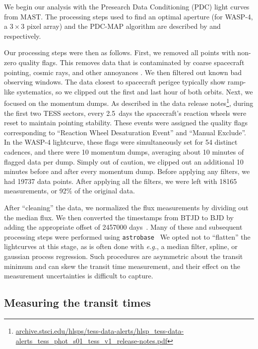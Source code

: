 \documentclass[12pt,twocolumn,tighten]{aastex62}
\begin{document}
We begin our analysis with the Presearch Data Conditioning (PDC) light
curves from MAST.  The processing steps used to find an optimal
aperture (for WASP-4, a $3\times 3$ pixel array) and the PDC-MAP
algorithm are described by \citet{smith_kepler_apertures_2017} and
\citet{smith_kepler_PDC_2017} respectively.

Our processing steps were then as follows.  First, we removed all
points with non-zero quality flags.  This removes data that is
contaminated by coarse spacecraft pointing, cosmic rays, and other
annoyances \citep{tess_data_product_description_2018}.  We then
filtered out known bad observing windows.  The data closest to
spacecraft perigee typically show ramp-like systematics, so we clipped
out the first and last hour of both orbits.  Next, we focused on the
momentum dumps. As described in the data release
notes\footnote{\url{archive.stsci.edu/hlsps/tess-data-alerts/hlsp_tess-data-alerts_tess_phot_s01_tess_v1_release-notes.pdf}},
during the first two TESS sectors, every 2.5~days the spacecraft's
reaction wheels were reset to maintain pointing stability.  These
events were assigned the quality flags corresponding to ``Reaction
Wheel Desaturation Event'' and ``Manual Exclude''.  In the WASP-4
lightcurve, these flags were simultaneously set for 54 distinct
cadences, and there were 10 momentum dumps, averaging about 10 minutes
of flagged data per dump.  Simply out of caution, we clipped out an
additional 10 minutes before and after every momentum dump.  Before
applying any filters, we had 19737 data points. After applying all the
filters, we were left with 18165 measurements, or 92\% of the original
data.

After ``cleaning'' the data, we normalized the flux measurements by
dividing out the median flux.  We then converted the timestamps from
BTJD to BJD by adding the appropriate offset of 2457000
days~\citep{tess_data_product_description_2018}.  Many of these and
subsequent processing steps were performed using
\texttt{astrobase}~\citep{bhatti_astrobase_2018} We opted not to
``flatten'' the lightcurves at this stage, as is often done with {\it e.g.}, a
median filter, spline, or gaussian process regression.  Such
procedures are asymmetric about the transit minimum and can skew the
transit time measurement, and their effect on the measurement
uncertainties is difficult to capture.



\subsection{Measuring the transit times}
\end{document}
